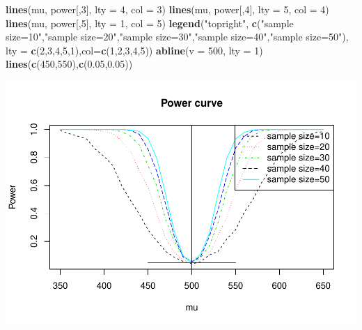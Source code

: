 \documentclass[
]{article}
\newenvironment{Shaded}{\begin{snugshade}}{\end{snugshade}}
\newcommand{\DataTypeTok}[1]{\textcolor[rgb]{0.13,0.29,0.53}{#1}}
\newcommand{\DecValTok}[1]{\textcolor[rgb]{0.00,0.00,0.81}{#1}}
\newcommand{\FloatTok}[1]{\textcolor[rgb]{0.00,0.00,0.81}{#1}}
\newcommand{\KeywordTok}[1]{\textcolor[rgb]{0.13,0.29,0.53}{\textbf{#1}}}
\newcommand{\NormalTok}[1]{#1}
\newcommand{\StringTok}[1]{\textcolor[rgb]{0.31,0.60,0.02}{#1}}
\begin{document}
\begin{Shaded}
\begin{Highlighting}[]
\KeywordTok{lines}\NormalTok{(mu, power[,}\DecValTok{3}\NormalTok{], }\DataTypeTok{lty =} \DecValTok{4}\NormalTok{, }\DataTypeTok{col =} \DecValTok{3}\NormalTok{)}
\KeywordTok{lines}\NormalTok{(mu, power[,}\DecValTok{4}\NormalTok{], }\DataTypeTok{lty =} \DecValTok{5}\NormalTok{, }\DataTypeTok{col =} \DecValTok{4}\NormalTok{)}
\KeywordTok{lines}\NormalTok{(mu, power[,}\DecValTok{5}\NormalTok{], }\DataTypeTok{lty =} \DecValTok{1}\NormalTok{, }\DataTypeTok{col =} \DecValTok{5}\NormalTok{)}
\KeywordTok{legend}\NormalTok{(}\StringTok{"topright"}\NormalTok{, }\KeywordTok{c}\NormalTok{(}\StringTok{"sample size=10"}\NormalTok{,}\StringTok{"sample size=20"}\NormalTok{,}\StringTok{"sample size=30"}\NormalTok{,}\StringTok{"sample size=40"}\NormalTok{,}\StringTok{"sample size=50"}\NormalTok{), }\DataTypeTok{lty =} \KeywordTok{c}\NormalTok{(}\DecValTok{2}\NormalTok{,}\DecValTok{3}\NormalTok{,}\DecValTok{4}\NormalTok{,}\DecValTok{5}\NormalTok{,}\DecValTok{1}\NormalTok{),}\DataTypeTok{col=}\KeywordTok{c}\NormalTok{(}\DecValTok{1}\NormalTok{,}\DecValTok{2}\NormalTok{,}\DecValTok{3}\NormalTok{,}\DecValTok{4}\NormalTok{,}\DecValTok{5}\NormalTok{))}
\KeywordTok{abline}\NormalTok{(}\DataTypeTok{v =} \DecValTok{500}\NormalTok{, }\DataTypeTok{lty =} \DecValTok{1}\NormalTok{)}
\KeywordTok{lines}\NormalTok{(}\KeywordTok{c}\NormalTok{(}\DecValTok{450}\NormalTok{,}\DecValTok{550}\NormalTok{),}\KeywordTok{c}\NormalTok{(}\FloatTok{0.05}\NormalTok{,}\FloatTok{0.05}\NormalTok{))}
\end{Highlighting}
\end{Shaded}

\includegraphics{hw04_yutingd3_files/figure-latex/unnamed-chunk-10-1.pdf}
\end{document}

